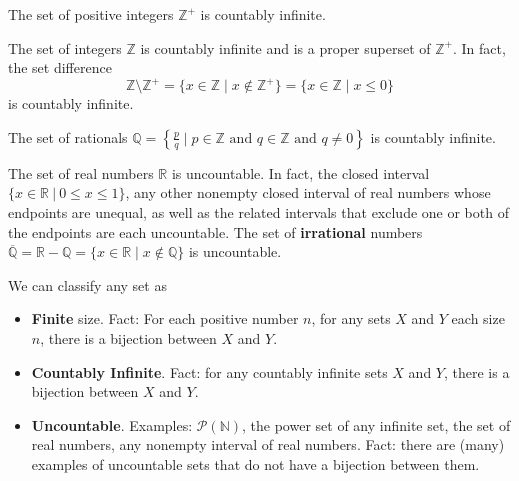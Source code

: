 

The set of positive integers $\mathbb{Z}^{+}$ is countably infinite.

The set of integers $\mathbb{Z}$ is countably infinite and is a proper superset of $\mathbb{Z}^{+}$. 
In fact, the set difference 
$$\mathbb{Z} \setminus \mathbb{Z}^{+} = \{ x \in \mathbb{Z} \mid x \notin \mathbb{Z}^+\} 
= \{ x \in \mathbb{Z} \mid x \leq 0 \}$$ is countably infinite.

The set of rationals 
$\mathbb{Q} = \left\{ \frac{p}{q} \mid p \in \mathbb{Z}  \text{ and  } 
q  \in \mathbb{Z} \text{ and } q \neq  0 \right\}$ is countably infinite.


The set of real numbers $\mathbb{R}$ is uncountable. In fact, the closed 
interval $\{x \in \mathbb{R} ~|~ 0 \leq x \leq 1\}$, 
any other nonempty closed interval of real numbers whose endpoints are 
unequal, as well as the related intervals that exclude one or both of the endpoints are
each uncountable.
The set of {\bf irrational} numbers $\overline{\mathbb{Q}} = \mathbb{R} - \mathbb{Q}
= \{ x \in \mathbb{R} \mid x \notin \mathbb{Q} \}$ is uncountable.

\vfill

We can classify any set as 
\begin{itemize}
\item {\bf Finite} size. Fact: For each positive number $n$, for any sets $X$ and $Y$ each 
size $n$, there is a bijection between $X$ and $Y$.
\item {\bf Countably Infinite}. Fact: for any countably infinite sets $X$ and $Y$, there is a bijection
between $X$ and $Y$.
\item {\bf Uncountable}. Examples: $\mathcal{P}(\mathbb{N})$, the power set of any infinite set, 
the set of real numbers, any nonempty interval of real numbers. Fact: there are (many) examples 
of uncountable sets that do not have a bijection between them.
\end{itemize}